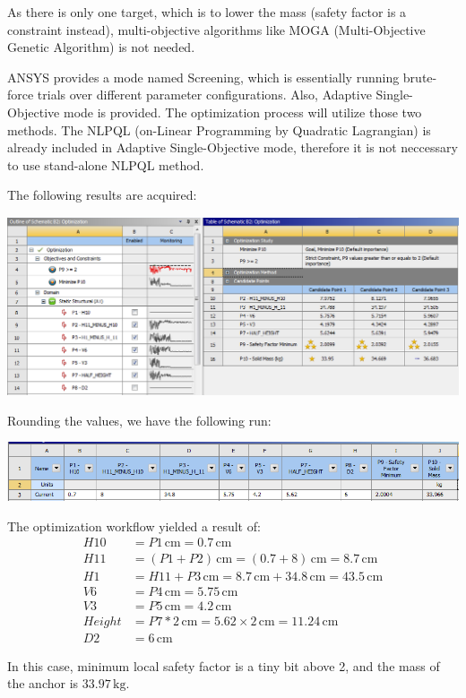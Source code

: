 \documentclass[a4paper,14pt]{extarticle}
\newcommand{\cm}{\,\si{\centi\meter}}
\newcommand{\kg}{\,\si{\kilo\gram}}
\begin{document}
As there is only one target, which is to lower the mass (safety factor is a constraint instead), multi-objective algorithms like MOGA (Multi-Objective Genetic Algorithm) is not needed.

ANSYS provides a mode named Screening, which is essentially running brute-force trials over different parameter configurations. Also, Adaptive Single-Objective mode is provided. The optimization process will utilize those two methods. The NLPQL (on-Linear Programming by Quadratic Lagrangian) is already included in Adaptive Single-Objective mode, therefore it is not neccessary to use stand-alone NLPQL method.

The following results are acquired:

\includegraphics[width=\textwidth]{ASO_RESULT_1.PNG}

Rounding the values, we have the following run:

\includegraphics[width=\textwidth]{EX_OPTM_FINAL.PNG}

The optimization workflow yielded a result of:
\begin{align*}
H10 &= P1 \cm = 0.7 \cm\\
H11 &= (P1 + P2) \cm = (0.7 + 8) \cm = 8.7 \cm\\
H1 &= H11 + P3 \cm = 8.7 \cm + 34.8 \cm = 43.5 \cm\\
V6 &= P4 \cm = 5.75 \cm\\
V3 &= P5 \cm = 4.2 \cm\\
Height &= P7 * 2 \cm = 5.62 \times 2 \cm = 11.24 \cm\\
D2 &= 6 \cm 
\end{align*}

In this case, minimum local safety factor is a tiny bit above 2, and the mass of the anchor is $33.97\kg$. 
\end{document}
